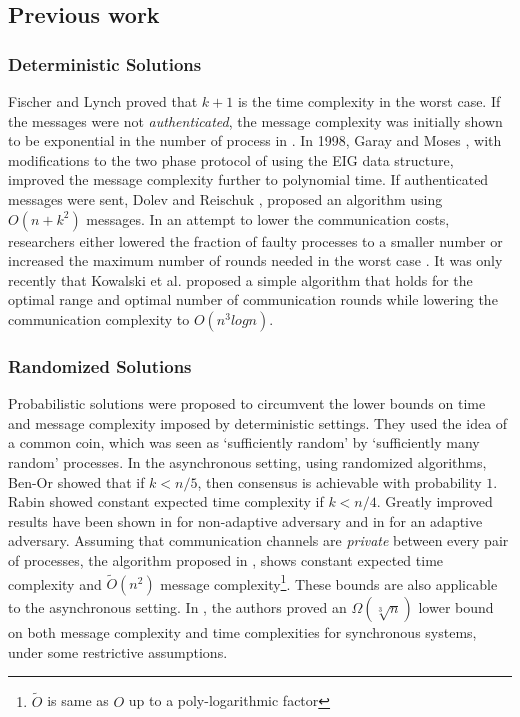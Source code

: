 \subsection{Previous work}

\subsubsection{Deterministic Solutions}
Fischer and Lynch \cite{Fischer81alower} proved that $k + 1$ is the time complexity in the worst case. If the messages were not \textit{authenticated}, the message complexity was initially shown to be exponential in the number of process in \cite{PeaseSL80}. In 1998, Garay and Moses \cite{GarayM98}, with modifications to the two phase protocol of \cite{BDDS87} using the EIG data structure, improved the message complexity further to polynomial time. If authenticated messages were sent, Dolev and Reischuk \cite{DolevR85}, proposed an algorithm using $O(n + k^2)$ messages. In an attempt to lower the communication costs, researchers either lowered the fraction of faulty processes to a smaller number \cite{} or increased the maximum number of rounds needed in the worst case \cite{}. It was only recently that Kowalski et al. \cite{} proposed a simple algorithm that holds for the optimal range and optimal number of communication rounds while lowering the communication complexity to $O(n^{3}logn)$.

\subsubsection{Randomized Solutions}
Probabilistic solutions were proposed to circumvent the lower bounds on time and message complexity imposed by deterministic settings. They used the idea of a common coin, which was seen as `sufficiently random' by `sufficiently many random' processes. 
In the asynchronous setting, using randomized algorithms, Ben-Or \cite{Ben-Or83} showed that if $k < n/5$, then consensus is achievable with probability $1$. Rabin \cite{Rabin83} showed constant expected time complexity if $k < n/4$. Greatly improved results have been shown in \cite{PCR14, KKKSS08, MHR14} for non-adaptive adversary and in \cite{KS13,AAKS14} for an adaptive adversary. Assuming that communication channels are \textit{private} between every pair of processes, the algorithm proposed in \cite{PR10}, shows constant expected time complexity and $\tilde{O}(n^2)$ message complexity\footnote{$\tilde{O}$ is same as $O$ up to a poly-logarithmic factor}. These bounds are also applicable to the asynchronous setting. In \cite{HKK08}, the authors proved an $\Omega(\sqrt[3]{n})$ lower bound on both message complexity and time complexities for synchronous systems, under some restrictive assumptions.


